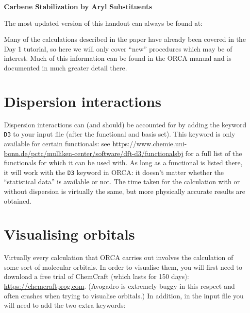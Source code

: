 \documentclass[10pt]{article}
\begin{document}

\textbf{\LARGE Carbene Stabilization by Aryl Substituents}

\vspace{0.5cm}

\begin{tcolorbox}[colframe=Green!70!white, colback=Green!10!white, width=0.95\textwidth, center]
    The most updated version of this handout can always be found at:
    \vspace{0.2cm}
    \begin{center}
    \end{center}
\end{tcolorbox}

\vspace{0.2cm}

Many of the calculations described in the paper\autocite{Woodcock2007} have already been covered in the Day 1 tutorial, so here we will only cover ``new'' procedures which may be of interest. Much of this information can be found in the ORCA manual and is documented in much greater detail there.

\section{Dispersion interactions}

Dispersion interactions\autocite{Grimme2011} can (and should) be accounted for by adding the keyword \texttt{D3} to your input file (after the functional and basis set). This keyword is only available for certain functionals: see \url{https://www.chemie.uni-bonn.de/pctc/mulliken-center/software/dft-d3/functionalsbj} for a full list of the functionals for which it can be used with. As long as a functional is listed there, it will work with the \texttt{D3} keyword in ORCA: it doesn't matter whether the ``statistical data'' is available or not. The time taken for the calculation with or without dispersion is virtually the same, but more physically accurate results are obtained.

\section{Visualising orbitals}

Virtually every calculation that ORCA carries out involves the calculation of some sort of molecular orbitals. In order to visualise them, you will first need to download a free trial of ChemCraft (which lasts for 150 days): \url{https://chemcraftprog.com}. (Avogadro is extremely buggy in this respect and often crashes when trying to visualise orbitals.) In addition, in the input file you will need to add the two extra keywords:
\end{document}
